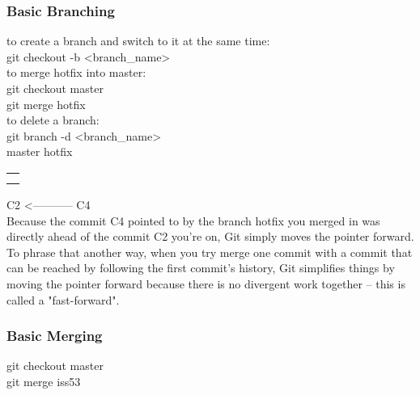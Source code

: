 \documentclass[11pt]{article}
\begin{document}
\subsubsection{Basic Branching}
\label{sec:org24db867}

to create a branch and switch to it at the same time:\\
git checkout -b <branch\_name>\\

to merge hotfix into master:\\
git checkout master\\
git merge hotfix\\

to delete a branch:\\
git branch -d <branch\_name>\\



master		hotfix\\
\begin{center}
\begin{tabular}{l}
\\
\\
\\
\end{tabular}
\end{center}
C2	  <----------- 	  C4\\

Because the commit C4 pointed to by the branch hotfix you merged in was directly ahead of the commit C2 you're on, Git simply moves the pointer forward.\\
To phrase that another way, when you try merge one commit with a commit that can be reached by following the first commit's history, Git simplifies things by moving the pointer forward because there is no divergent work together -- this is called a "fast-forward".\\

\subsubsection{Basic Merging}
\label{sec:orgb330fea}

git checkout master\\
git merge iss53\\
\end{document}
